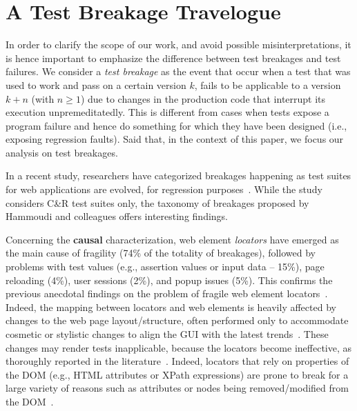 \section{A Test Breakage Travelogue}\label{sec:breakage-travelogue}

In order to clarify the scope of our work, and avoid possible misinterpretations, it is hence important to emphasize the difference between test breakages and test failures. We consider a \textit{test breakage} as the event that occur when a test that was used to work and pass on a certain version $k$, fails to be applicable to a version $k+n$ (with $n \geq 1$) due to changes in the production code that interrupt its execution unpremeditatedly. %
This is different from cases when tests expose a program failure and hence do something for which they have been designed (i.e., exposing regression faults).
Said that, in the context of this paper, we focus our analysis on test breakages.

In a recent study, researchers have categorized breakages happening as test suites for web applications are evolved, for regression purposes~\cite{Hammoudi-2016-ICST}. While the study considers C\&R test suites only, the taxonomy of breakages proposed by Hammoudi and colleagues offers interesting findings. 

Concerning the \textbf{causal} characterization, web element \textit{locators} have emerged as the main cause of fragility (74\% of the totality of breakages), followed by problems with test values (e.g., assertion values or input data -- 15\%), page reloading (4\%), user sessions (2\%), and popup issues (5\%). 
%
This confirms the previous anecdotal findings on the problem of fragile web element locators~\cite{2016-Leotta-JSEP,2014-leotta-WoSAR,Daniel:2011:AGR:2002931.2002937,2013-Ricca-wse}.
%
Indeed, the mapping between locators and web elements is heavily affected by changes to the web page layout/structure, often performed only to accommodate cosmetic or stylistic changes to align the GUI with the latest trends~\cite{2016-leotta-Advances,2016-Leotta-JSEP}. These changes may render tests inapplicable, because the locators become ineffective, as thoroughly reported in the literature~\cite{2016-leotta-Advances,2016-Leotta-JSEP,Choudhary:2011:WWA:2002931.2002935,Hammoudi-2016-ICST,2013-Ricca-wse}. 
Indeed, locators that rely on properties of the DOM (e.g., HTML attributes or XPath expressions) are prone to break for a large variety of reasons such as attributes or nodes being removed/modified from the DOM~\cite{Choudhary:2011:WWA:2002931.2002935}.

